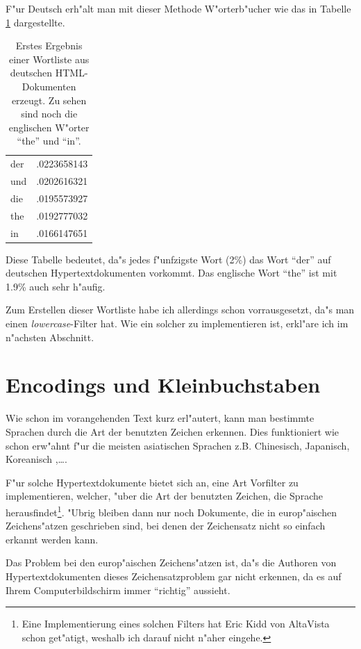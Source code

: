 F"ur Deutsch erh"alt man mit dieser Methode W"orterb"ucher wie das in Tabelle \ref{erstesWoerterbuch} dargestellte.

\begin{table}[t]
\begin{center}
\begin{tabular}{lr}
der		&.0223658143 \\
und		&.0202616321 \\
die		&.0195573927 \\
the		&.0192777032 \\
in		&.0166147651 \\
\end{tabular}
\end{center}
\caption{Erstes Ergebnis einer Wortliste aus deutschen HTML-Dokumenten erzeugt. Zu sehen sind noch die englischen W"orter "`the"' und "`in"'.}
\label{erstesWoerterbuch}
\end{table}

Diese Tabelle bedeutet, da"s jedes f"unfzigste Wort (2\%) das Wort "`der"' auf deutschen Hypertextdokumenten vorkommt. Das englische Wort "`the"' ist mit 1.9\% auch sehr h"aufig.

Zum Erstellen dieser Wortliste habe ich allerdings schon vorrausgesetzt, da"s man einen {\em lowercase}-Filter hat. Wie ein solcher zu implementieren ist, erkl"are ich im n"achsten Abschnitt.



\section{Encodings und Kleinbuchstaben}

Wie schon im vorangehenden Text kurz erl"autert, kann man bestimmte Sprachen durch die Art der benutzten Zeichen erkennen. Dies funktioniert wie schon erw"ahnt f"ur die meisten asiatischen Sprachen z.B. Chinesisch, Japanisch, Koreanisch ,\dots .

F"ur solche Hypertextdokumente bietet sich an, eine Art Vorfilter zu implementieren, welcher, "uber die Art der benutzten Zeichen, die Sprache herausfindet\footnote{Eine Implementierung eines solchen Filters hat Eric Kidd von AltaVista schon get"atigt, weshalb ich darauf nicht n"aher eingehe.}. "Ubrig bleiben dann nur noch Dokumente, die in europ"aischen Zeichens"atzen geschrieben sind, bei denen der Zeichensatz nicht so einfach erkannt werden kann.

Das Problem bei den europ"aischen Zeichens"atzen ist, da"s die Authoren von Hypertextdokumenten dieses Zeichensatzproblem gar nicht erkennen, da es auf Ihrem Computerbildschirm immer "`richtig"' aussieht. 

